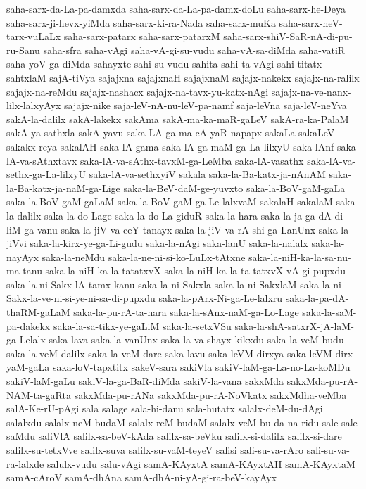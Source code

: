 {saha-sarx-da-La-pa-damxda
saha-sarx-da-La-pa-damx-doLu
saha-sarx-he-Deya
saha-sarx-ji-hevx-yiMda
saha-sarx-ki-ra-Nada
saha-sarx-muKa
saha-sarx-neV-tarx-vuLaLx
saha-sarx-patarx
saha-sarx-patarxM
saha-sarx-shiV-SaR-nA-di-pu-ru-Sanu
saha-sfra
saha-vAgi
saha-vA-gi-su-vudu
saha-vA-sa-diMda
saha-vatiR
saha-yoV-ga-diMda
sahayxte
sahi-su-vudu
sahita
sahi-ta-vAgi
sahi-titatx
sahtxlaM
sajA-tiVya
sajajxna
sajajxnaH
sajajxnaM
sajajx-nakekx
sajajx-na-ralilx
sajajx-na-reMdu
sajajx-nashacx
sajajx-na-tavx-yu-katx-nAgi
sajajx-na-ve-nanx-lilx-lalxyAyx
sajajx-nike
saja-leV-nA-nu-leV-pa-namf
saja-leVna
saja-leV-neYva
sakA-la-dalilx
sakA-lakekx
sakAma
sakA-ma-ka-maR-gaLeV
sakA-ra-ka-PalaM
sakA-ya-sathxla
sakA-yavu
saka-LA-ga-ma-cA-yaR-napapx
sakaLa
sakaLeV
sakakx-reya
sakalAH
saka-lA-gama
saka-lA-ga-maM-ga-La-lilxyU
saka-lAnf
saka-lA-va-sAthxtavx
saka-lA-va-sAthx-tavxM-ga-LeMba
saka-lA-vasathx
saka-lA-va-sethx-ga-La-lilxyU
saka-lA-va-sethxyiV
sakala
saka-la-Ba-katx-ja-nAnAM
saka-la-Ba-katx-ja-naM-ga-Lige
saka-la-BeV-daM-ge-yuvxto
saka-la-BoV-gaM-gaLa
saka-la-BoV-gaM-gaLaM
saka-la-BoV-gaM-ga-Le-lalxvaM
sakalaH
sakalaM
saka-la-dalilx
saka-la-do-Lage
saka-la-do-La-giduR
saka-la-hara
saka-la-ja-ga-dA-di-liM-ga-vanu
saka-la-jiV-va-ceY-tanayx
saka-la-jiV-va-rA-shi-ga-LanUnx
saka-la-jiVvi
saka-la-kirx-ye-ga-Li-gudu
saka-la-nAgi
saka-lanU
saka-la-nalalx
saka-la-nayAyx
saka-la-neMdu
saka-la-ne-ni-si-ko-LuLx-tAtxne
saka-la-niH-ka-la-sa-nu-ma-tanu
saka-la-niH-ka-la-tatatxvX
saka-la-niH-ka-la-ta-tatxvX-vA-gi-pupxdu
saka-la-ni-Sakx-lA-tamx-kanu
saka-la-ni-Sakxla
saka-la-ni-SakxlaM
saka-la-ni-Sakx-la-ve-ni-si-ye-ni-sa-di-pupxdu
saka-la-pArx-Ni-ga-Le-lalxru
saka-la-pa-dA-thaRM-gaLaM
saka-la-pu-rA-ta-nara
saka-la-sAnx-naM-ga-Lo-Lage
saka-la-saM-pa-dakekx
saka-la-sa-tikx-ye-gaLiM
saka-la-setxVSu
saka-la-shA-satxrX-jA-laM-ga-Lelalx
saka-lava
saka-la-vanUnx
saka-la-va-shayx-kikxdu
saka-la-veM-budu
saka-la-veM-dalilx
saka-la-veM-dare
saka-lavu
saka-leVM-dirxya
saka-leVM-dirx-yaM-gaLa
saka-loV-tapxtitx
sakeV-sara
sakiVla
sakiV-laM-ga-La-no-La-koMDu
sakiV-laM-gaLu
sakiV-la-ga-BaR-diMda
sakiV-la-vana
sakxMda
sakxMda-pu-rA-NAM-ta-gaRta
sakxMda-pu-rANa
sakxMda-pu-rA-NoVkatx
sakxMdha-veMba
salA-Ke-rU-pAgi
sala
salage
sala-hi-danu
sala-hutatx
salalx-deM-du-dAgi
salalxdu
salalx-neM-budaM
salalx-reM-budaM
salalx-veM-bu-da-na-ridu
sale
sale-saMdu
saliVlA
salilx-sa-beV-kAda
salilx-sa-beVku
salilx-si-dalilx
salilx-si-dare
salilx-su-tetxVve
salilx-suva
salilx-su-vaM-teyeV
salisi
sali-su-va-rAro
sali-su-va-ra-lalxde
salulx-vudu
salu-vAgi
samA-KAyxtA
samA-KAyxtAH
samA-KAyxtaM
samA-cAroV
samA-dhAna
samA-dhA-ni-yA-gi-ra-beV-kayAyx
}
